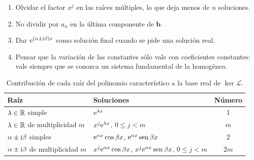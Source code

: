 \documentclass[11pt,twoside]{article}
\newcommand\Lop{\mathcal L}
\newcommand\vb{\bm b}
\begin{document}
\begin{observacion}\label{obs:errores}
\begin{enumerate}[label=(\roman*)]
\item Olvidar el factor $x^j$ en las raíces múltiples, lo que deja menos de $n$ soluciones.
\item No dividir por $a_n$ en la última componente de $\vb$.
\item Dar $\mathrm{e}^{(\alpha\pm\mathrm{i}\beta)x}$ como solución final cuando se pide una solución real.
\item Pensar que la variación de las constantes sólo vale con coeficientes constantes: vale siempre que se conozca un
sistema fundamental de la homogénea.
\end{enumerate}
\end{observacion}

\begin{table}[!htbp]
\centering
\caption{Contribución de cada raíz del polinomio característico a la base real de $\ker\Lop$.}
\label{tab:raices}
\renewcommand\arraystretch{1.35}
\begin{tabular}{@{}l l c@{}}
\toprule
\textcolor{acc}{Raíz} & \textcolor{acc}{Soluciones} & \textcolor{acc}{Número}\\
\midrule
$\lambda\in\mathbb{R}$ simple & $\mathrm{e}^{\lambda x}$ & 1\\
$\lambda\in\mathbb{R}$ de multiplicidad $m$ & $x^j\mathrm{e}^{\lambda x}$, $0\le j<m$ & $m$\\
$\alpha\pm\mathrm{i}\beta$ simples & $\mathrm{e}^{\alpha x}\cos\beta x$, $\mathrm{e}^{\alpha x}\operatorname{sen}\beta x$ & 2\\
$\alpha\pm\mathrm{i}\beta$ de multiplicidad $m$ & $x^j\mathrm{e}^{\alpha x}\cos\beta x$, $x^j\mathrm{e}^{\alpha x}\operatorname{sen}\beta x$, $0\le j<m$ & $2m$\\
\bottomrule
\end{tabular}
\end{table}

\end{document}

